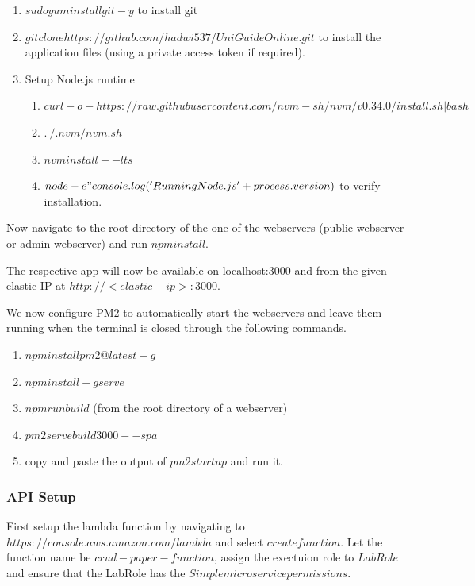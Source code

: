 \documentclass[12pt]{article}
\begin{document}
\begin{enumerate}
    \item $sudo yum install git -y$ to install git
    \item $git clone https://github.com/hadwi537/UniGuideOnline.git$ to install the application files (using a private access token if required).
    \item Setup Node.js runtime
    \begin{enumerate}
        \item $curl -o- https://raw.githubusercontent.com/nvm-sh/nvm/v0.34.0/install.sh | bash$
        \item $. ~/.nvm/nvm.sh$
        \item $nvm install --lts$
        \item $node -e "console.log('Running Node.js ' + process.version)$ to verify installation.
    \end{enumerate}
\end{enumerate}

Now navigate to the root directory of the one of the webservers (public-webserver or admin-webserver) and run $npm install$.

The respective app will now be available on localhost:3000 and from the given elastic IP at $http://<elastic-ip>:3000$.

We now configure PM2 to automatically start the webservers and leave them running when the terminal is closed through the following commands.

\begin{enumerate}
    \item $npm install pm2@latest -g$
    \item $npm install -g serve$
    \item $npm run build$ (from the root directory of a webserver)
    \item $pm2 serve build 3000 --spa$
    \item copy and paste the output of $pm2 startup$ and run it.

\end{enumerate}
    
\subsubsection{API Setup}

First setup the lambda function by navigating to $https://console.aws.amazon.com/lambda$ and select $create function$. Let the function name be $crud-paper-function$, assign the exectuion role to $LabRole$ and ensure that the LabRole has the $Simple microservice permissions$.
\end{document}
